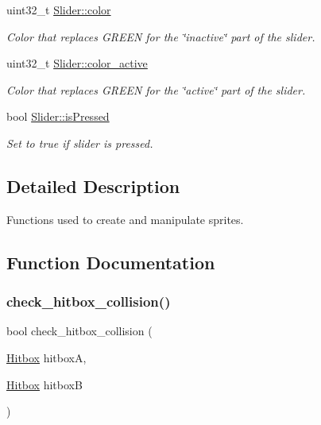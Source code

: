 \begin{DoxyCompactItemize}
uint32\+\_\+t \mbox{\hyperlink{group__sprite_ga0ec90999b2ad7a80de51ebbf6603af87}{Slider\+::color}}
\begin{DoxyCompactList}\small\item\em Color that replaces G\+R\+E\+EN for the \char`\"{}inactive\char`\"{} part of the slider. \end{DoxyCompactList}\item 
uint32\+\_\+t \mbox{\hyperlink{group__sprite_ga30afc9a607e8770d283f7219d837bfc2}{Slider\+::color\+\_\+active}}
\begin{DoxyCompactList}\small\item\em Color that replaces G\+R\+E\+EN for the \char`\"{}active\char`\"{} part of the slider. \end{DoxyCompactList}\item 
bool \mbox{\hyperlink{group__sprite_gafebb65462372e968ef98ad909aa6413a}{Slider\+::is\+Pressed}}
\begin{DoxyCompactList}\small\item\em Set to true if slider is pressed. \end{DoxyCompactList}\end{DoxyCompactItemize}


\subsection{Detailed Description}
Functions used to create and manipulate sprites. 

\subsection{Function Documentation}
\mbox{\label{group__sprite_gace4cfe7bbf61f89e7342615ed1dccf56}} 
\subsubsection{\texorpdfstring{check\+\_\+hitbox\+\_\+collision()}{check\_hitbox\_collision()}}
{\footnotesize\ttfamily bool check\+\_\+hitbox\+\_\+collision (\begin{DoxyParamCaption}\item[{\mbox{\hyperlink{struct_hitbox}{Hitbox}}}]{hitboxA,  }\item[{\mbox{\hyperlink{struct_hitbox}{Hitbox}}}]{hitboxB }\end{DoxyParamCaption})}



